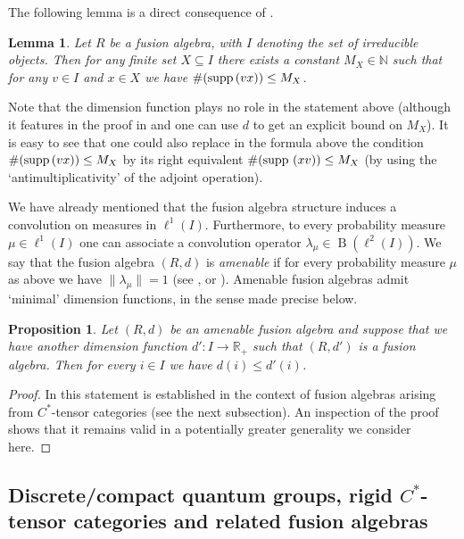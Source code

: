 \documentclass[11 pt, leqno]{amsart}
\newcommand{\NN}{\mathbb{N}}
\newcommand{\RR}{\mathbb{R}}
\DeclareMathOperator{\B}{B}
\newtheorem{proposition}[theorem]{Proposition}
\newtheorem{lemma}[theorem]{Lemma}
\theoremstyle{definition}
\numberwithin{equation}{section}
\begin{document}
The following lemma is a direct consequence of \cite[Proposition 1.2 (6)]{HiaiIzumi}.

\begin{lemma} \label{lem:prop}
	Let $R$ be a fusion algebra, with $I$ denoting the set of irreducible objects. %
	Then for any finite set $X \subseteq I$ there exists a constant $M_X\in \NN$ such that for any $v \in I$ and $x \in X$ we have $\# (\textup{supp}\,(vx))\leq M_X$. 	
\end{lemma}

Note that the dimension function plays no role in the statement above (although it features in the proof in \cite{HiaiIzumi} and one can use $d$ to get an explicit bound on $M_X$). It is easy to see that one could also replace in the formula above the condition  $\# (\textup{supp}\,(vx))\leq M_X$ by its right equivalent  $\#(\textup{supp }(xv))\leq M_X$ (by using the `antimultiplicativity' of the adjoint operation).


We have already mentioned that the fusion algebra structure induces a convolution on measures in $\ell^1(I)$. Furthermore, to every probability measure $\mu \in \ell^1(I)$ one can associate a convolution operator $\lambda_\mu \in \B(\ell^2(I))$. We say that the fusion algebra $(R,d)$ is \emph{amenable} if for every probability measure $\mu$ as above we have $\|\lambda_\mu\|=1$ (see \cite[Theorem 4.6]{HiaiIzumi}, \cite[Theorem 3.3]{Kyed} or \cite[Section 2.7]{NeshveyevTuset}). Amenable fusion algebras admit `minimal' dimension functions, in the sense made precise below.


\begin{proposition}\label{prop:amenmin}
Let $(R,d)$ be an amenable fusion algebra and suppose that we have another dimension function $d'\colon I \to \RR_+$ such that $(R,d')$ is a fusion algebra. Then for every $i \in I$ we have $d(i) \leq d'(i)$.	
\end{proposition}	

\begin{proof}
	In \cite[Proposition 2.7.7]{NeshveyevTuset} this statement is established in the context of fusion algebras arising from $C^*$-tensor categories (see the next subsection). An inspection of the proof shows that it remains valid in a potentially greater generality we consider here.
\end{proof}


\subsection{Discrete/compact quantum groups, rigid $C^*$-tensor categories and related fusion algebras}\label{sec:discrete/compact}
\end{document}

